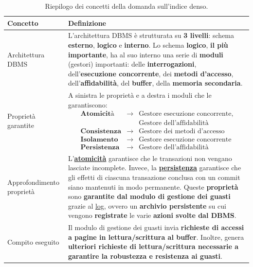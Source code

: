 \documentclass[a4paper]{article}
\begin{document}
\begin{enumerate}
		\begin{table}[!htp]
			\centering
			\begin{tabular}{@{} l p{23em} @{}}
				\toprule
				Concetto & Definizione \\
				\midrule
				Architettura DBMS & L'architettura DBMS è strutturata su \textbf{3 livelli}: schema \textbf{esterno}, \textbf{logico} e \textbf{interno}. Lo schema \textbf{logico}, \textbf{il più importante}, ha al suo interno una serie di \textbf{moduli} (gestori) importanti: delle \textbf{interrogazioni}, dell'\textbf{esecuzione concorrente}, dei \textbf{metodi d'accesso}, dell'\textbf{affidabilità}, del \textbf{buffer}, della \textbf{memoria secondaria}. \\ [.7em]
				Proprietà garantite & A sinistra le proprietà e a destra i moduli che le garantiscono:
				\begin{equation*}
					\begin{array}{lll}
						\textbf{Atomicità}	&\rightarrow& \text{Gestore esecuzione concorrente,} \\
						&			& \text{Gestore dell'affidabilità} \\ [.5em]
						\textbf{Consistenza}&\rightarrow& \text{Gestore dei metodi d'accesso} \\ [.5em]
						\textbf{Isolamento}	&\rightarrow& \text{Gestore esecuzione concorrente} \\ [.5em]
						\textbf{Persistenza}&\rightarrow& \text{Gestore dell'affidabilità}
					\end{array}
				\end{equation*} \\ [.7em]
				Approfondimento proprietà & L'\textbf{\underline{atomicità}} garantisce che le transazioni non vengano lasciate incomplete. Invece, la \textbf{\underline{persistenza}} garantisce che gli effetti di ciascuna transazione conclusa con un commit siano mantenuti in modo permanente. Queste \textbf{proprietà} sono \textbf{garantite dal modulo di gestione dei guasti} grazie al \underline{log}, ovvero un \textbf{archivio persistente} su cui vengono \textbf{registrate} le varie \textbf{azioni svolte dal DBMS}. \\ [.7em]
				Compito eseguito & Il modulo di gestione dei guasti invia \textbf{richieste di accessi a pagine in lettura/scrittura al buffer}.\newline
				Inoltre, genera \textbf{ulteriori richieste di lettura/scrittura necessarie a garantire la robustezza e resistenza ai guasti}. \\
				\bottomrule
			\end{tabular}
			\caption{Riepilogo dei concetti della domanda sull'indice denso.}
		\end{table}\newpage
		

\end{enumerate}
\end{document}
